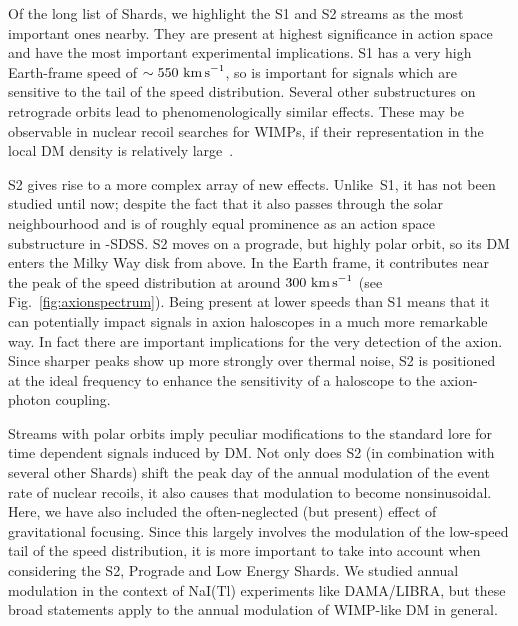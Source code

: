 \documentclass[prd,10pt,twocolumn,showpacs,nofootinbib,aps,superscriptaddress,preprintnumbers]{revtex4-1}
\newcommand{\kms}{\textrm{ km \!s}^{-1}}
\newcommand{\Gaia}{\!{\it Gaia}\xspace}
\begin{document}
Of the long list of Shards, we highlight the S1 and S2 streams as the most important ones nearby. They are present at highest significance in action space~\cite{Myeong:Preprint,Myeong:2017} and have the most important experimental implications. S1 has a very high Earth-frame speed of $\sim 550 \kms$, so is important for signals which are sensitive to the tail of the speed distribution. Several other substructures on retrograde orbits lead to phenomenologically similar effects.  These may be observable in nuclear recoil searches for WIMPs, if their representation in the local DM density is relatively large~\cite{OHare:2018trr}.

S2 gives rise to a more complex array of new effects. Unlike~S1, it has not been studied until now; despite the fact that it also passes through the solar neighbourhood and is of roughly equal prominence as an action space substructure in \Gaia-SDSS. S2 moves on a prograde, but highly polar orbit, so its DM enters the Milky Way disk from above. In the Earth frame, it contributes near the peak of the speed distribution at around $300 \kms$ (see Fig.~\ref{fig:axionspectrum}). Being present at lower speeds than S1 means that it can potentially impact signals in axion haloscopes in a much more remarkable way. In fact there are important implications for the very detection of the axion. Since sharper peaks show up more strongly over thermal noise, S2 is positioned at the ideal frequency to enhance the sensitivity of a haloscope to the axion-photon coupling. 

Streams with polar orbits imply peculiar modifications to the standard lore for time dependent signals induced by DM. Not only does S2 (in combination with several other Shards) shift the peak day of the annual modulation of the event rate of nuclear recoils, it also causes that modulation to become nonsinusoidal. Here, we have also included the often-neglected (but present) effect of gravitational focusing. Since this largely involves the modulation of the low-speed tail of the speed distribution, it is more important to take into account when considering the S2, Prograde and Low Energy Shards. We studied annual modulation in the context of NaI(Tl) experiments like DAMA/LIBRA, but these broad statements apply to the annual modulation of WIMP-like DM in general.
\end{document}

